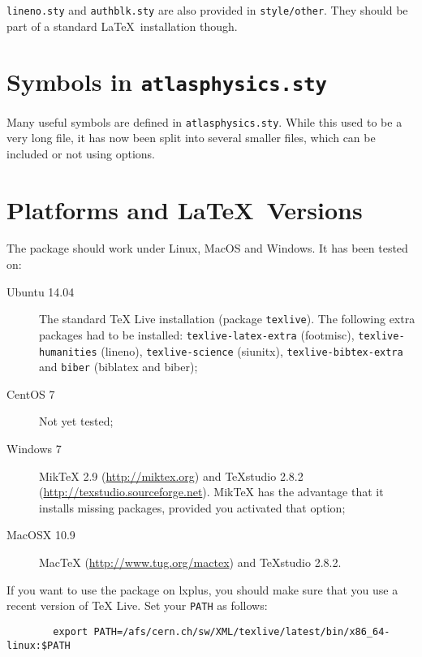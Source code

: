 \documentclass[UKenglish]{style/atlasdoc}
\begin{document}
\texttt{lineno.sty} and \texttt{authblk.sty} are also provided in \texttt{style/other}.
They should be part of a standard \LaTeX\ installation though.


\section{Symbols in \texttt{atlasphysics.sty}}
\label{sec:atlasphysics}

Many useful symbols are defined in \texttt{atlasphysics.sty}.
While this used to be a very long file, it has now been split into several smaller files,
which can be included or not using options.


\section{Platforms and \LaTeX\ Versions}
\label{sec:version}

The package should work under Linux, MacOS and Windows. It has been tested on:
\begin{description}
\item[Ubuntu 14.04]
	The standard TeX Live installation (package \texttt{texlive}).
	The following extra packages had to be installed:
	\texttt{texlive-latex-extra} (footmisc),
	\texttt{texlive-humanities} (lineno),
	\texttt{texlive-science} (siunitx),
	\texttt{texlive-bibtex-extra} and \texttt{biber} (biblatex and biber);
\item[CentOS 7] Not yet tested; 
\item[Windows 7]
	MikTeX 2.9 (\url{http://miktex.org}) and TeXstudio 2.8.2 (\url{http://texstudio.sourceforge.net}).
	MikTeX has the advantage that it installs missing packages, provided you activated that option;
\item[MacOSX 10.9]
	MacTeX (\url{http://www.tug.org/mactex}) and TeXstudio 2.8.2.
\end{description}

If you want to use the package on lxplus, you should make sure that you use a recent version of TeX Live.
Set your \texttt{PATH} as follows:
\begin{verbatim}
		export PATH=/afs/cern.ch/sw/XML/texlive/latest/bin/x86_64-linux:$PATH
\end{verbatim}
\end{document}
